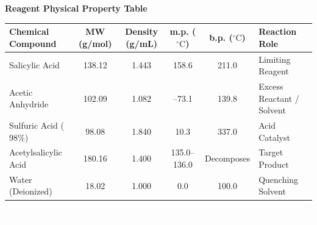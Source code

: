 \documentclass[10pt,a4paper]{article}
\newcommand{\labsection}[2]{%
  \vspace{0.25cm}%
  \begin{tcolorbox}[
    enhanced,
    colback=NavyDark,
    colframe=NavyDark,
    arc=3pt,
    boxrule=0pt,
    left=8pt, right=8pt, top=3pt, bottom=3pt
  ]
    \textcolor{white}{\bfseries\small #1 \quad #2}
  \end{tcolorbox}%
  \vspace{0.05cm}%
}
\begin{document}
\vspace{0.05cm}

\textbf{\small Reagent Physical Property Table}
\vspace{2pt}

\scriptsize
\begin{tabularx}{\textwidth}{@{}l c c c c X@{}}
  \toprule
  \rowcolor{NavyDark}
  \color{white}\textbf{Chemical Compound} & \color{white}\textbf{MW (g/mol)} & \color{white}\textbf{Density (g/mL)} & \color{white}\textbf{m.p. ($^\circ\text{C}$)} & \color{white}\textbf{b.p. ($^\circ\text{C}$)} & \color{white}\textbf{Reaction Role} \\
  \midrule
  Salicylic Acid & 138.12 & 1.443 & 158.6 & 211.0 & Limiting Reagent \\
  Acetic Anhydride & 102.09 & 1.082 & --73.1 & 139.8 & Excess Reactant / Solvent \\
  Sulfuric Acid ($98\%$) & 98.08 & 1.840 & 10.3 & 337.0 & Acid Catalyst \\
  Acetylsalicylic Acid & 180.16 & 1.400 & 135.0--136.0 & Decomposes & Target Product \\
  Water (Deionized) & 18.02 & 1.000 & 0.0 & 100.0 & Quenching Solvent \\
  \bottomrule
\end{tabularx}

\pagebreak

\labsection{4}{Detailed Experimental Work Plan}
\end{document}
